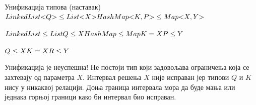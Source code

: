 \documentclass[xcolor=table]{beamer}
\begin{document}
\begin{frame}[allowframebreaks]{Унификација типова (наставак)}
        \begin{math}
LinkedList\mathord{<}Q\mathord{>} \leq List\mathord{<}X\mathord{>}
\newline
HashMap\mathord{<}K, P\mathord{>} \leq Map\mathord{<}X, Y\mathord{>}
        \end{math}
        
        \framebreak
        
        \begin{math}
LinkedList \leq List
\newline
Q \leq X
\newline
HashMap \leq Map
\newline
K = X
\newline
P \leq Y
        \end{math}
        
        \framebreak
        
        \begin{math}
Q \leq X
\newline
K = X
\newline
R \leq Y
\newline
        \end{math}
        
        Унификација је неуспешна!
        \newline\newline
        Не постоји тип који задовољава ограничења која се захтевају од параметра \begin{math}X\end{math}.
        \newline\newline
        Интервал решења \begin{math}X\end{math} није исправан јер типови \begin{math}Q\end{math} и \begin{math}K\end{math} нису у никаквој релацији.
        \newline\newline
        Доња граница интервала мора да буде мања или једнака горњој граници како би интервал био исправан.
    \end{frame}
    
\end{document}
